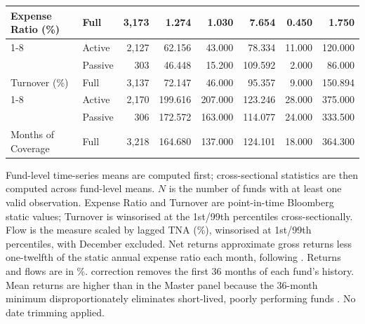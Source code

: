 \begin{table}[H]
{\begin{threeparttable}
\begin{tabular}[t]{llrrrrrr}
\multirow{-3}{*}{\raggedright\arraybackslash Expense Ratio (\%)} & Full & 3,173 & 1.274 & 1.030 & 7.654 & 0.450 & 1.750\\
\cmidrule{1-8}
 & Active & 2,127 & 62.156 & 43.000 & 78.334 & 11.000 & 120.000\\

 & Passive & 303 & 46.448 & 15.200 & 109.592 & 2.000 & 86.000\\

\multirow{-3}{*}{\raggedright\arraybackslash Turnover (\%)} & Full & 3,137 & 72.147 & 46.000 & 95.357 & 9.000 & 150.894\\
\cmidrule{1-8}
 & Active & 2,170 & 199.616 & 207.000 & 123.246 & 28.000 & 375.000\\

 & Passive & 306 & 172.572 & 163.000 & 114.077 & 24.000 & 333.500\\

\multirow{-3}{*}{\raggedright\arraybackslash Months of Coverage} & Full & 3,218 & 164.680 & 137.000 & 124.101 & 18.000 & 364.300\\
\bottomrule
\end{tabular}
\begin{tablenotes}
\item Fund-level time-series means are computed first; cross-sectional statistics are then computed across fund-level means. $N$ is the number of funds with at least one valid observation. Expense Ratio and Turnover are point-in-time Bloomberg static values; Turnover is winsorised at the 1st/99th percentiles cross-sectionally. Flow is the \citet{SirriTufano1998} measure scaled by lagged TNA (\%), winsorised at 1st/99th percentiles, with December excluded. Net returns approximate gross returns less one-twelfth of the static annual expense ratio each month, following \citet{BarrasScailletWermers2010}. Returns and flows are in \%. \citet{Evans2010} correction removes the first 36 months of each fund's history. Mean returns are higher than in the Master panel because the 36-month minimum disproportionately eliminates short-lived, poorly performing funds \citep{Evans2010}. No date trimming applied.
\end{tablenotes}
\end{threeparttable}
}
\end{table}
